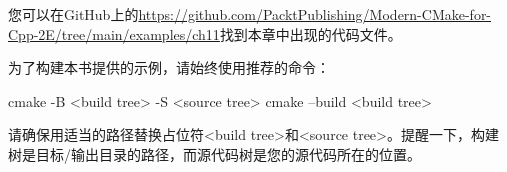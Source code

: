 您可以在GitHub上的\url{https://github.com/PacktPublishing/Modern-CMake-for-Cpp-2E/tree/main/examples/ch11}找到本章中出现的代码文件。

为了构建本书提供的示例，请始终使用推荐的命令：

\begin{shell}
cmake -B <build tree> -S <source tree>
cmake --build <build tree>
\end{shell}

请确保用适当的路径替换占位符<build tree>和<source tree>。提醒一下，构建树是目标/输出目录的路径，而源代码树是您的源代码所在的位置。












